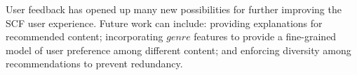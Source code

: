 User feedback has opened up many new possibilities for further improving 
the SCF user experience.  Future work can include: providing 
explanations for recommended content; incorporating 
$\mathit{genre}$ features to provide a fine-grained model of user
preference among different content; and enforcing diversity among
recommendations to prevent redundancy.



